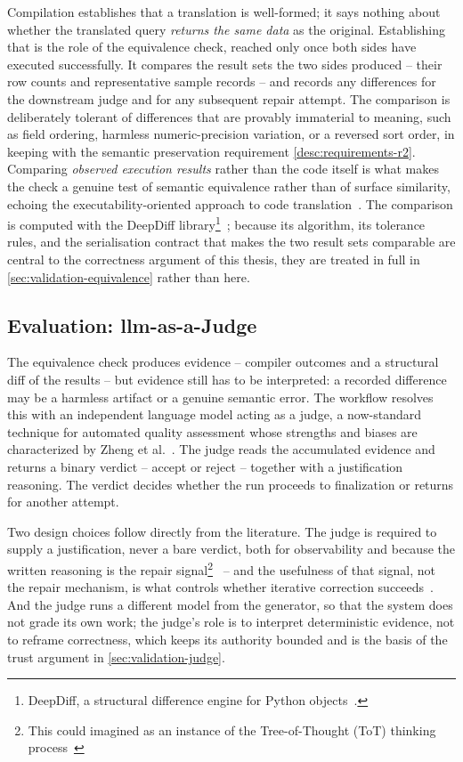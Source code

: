 Compilation establishes that a translation is well-formed; it says nothing about whether the translated query \emph{returns the same data} as the original. Establishing that is the role of the equivalence check, reached only once both sides have executed successfully. It compares the result sets the two sides produced -- their row counts and representative sample records -- and records any differences for the downstream judge and for any subsequent repair attempt. The comparison is deliberately tolerant of differences that are provably immaterial to meaning, such as field ordering, harmless numeric-precision variation, or a reversed sort order, in keeping with the semantic preservation requirement \ref{desc:requirements-r2}. Comparing \emph{observed execution results} rather than the code itself is what makes the check a genuine test of semantic equivalence rather than of surface similarity, echoing the executability-oriented approach to code translation~\cite{execoder2025}. The comparison is computed with the DeepDiff library\footnote{DeepDiff, a structural difference engine for Python objects~\cite{deepdiff}.}~\cite{deepdiff}; because its algorithm, its tolerance rules, and the serialisation contract that makes the two result sets comparable are central to the correctness argument of this thesis, they are treated in full in \cref{sec:validation-equivalence} rather than here.

\subsection{Evaluation: \Acrshort{llm}-as-a-Judge}
\label{sec:workflow-judge}

The equivalence check produces evidence -- compiler outcomes and a structural diff of the results -- but evidence still has to be interpreted: a recorded difference may be a harmless artifact or a genuine semantic error. The workflow resolves this with an independent language model acting as a judge, a now-standard technique for automated quality assessment whose strengths and biases are characterized by Zheng et al.~\cite{zhengJudgingLLMasaJudge2023}. The judge reads the accumulated evidence and returns a binary verdict -- accept or reject -- together with a justification reasoning. The verdict decides whether the run proceeds to finalization or returns for another attempt.

Two design choices follow directly from the literature. The judge is required to supply a justification, never a bare verdict, both for observability and because the written reasoning is the repair signal\footnote{This could imagined as an instance of the Tree-of-Thought (ToT) thinking process~\cite{yaoTreeThoughtsDeliberate2023}}~\cite{yaoTreeThoughtsDeliberate2023} -- and the usefulness of that signal, not the repair mechanism, is what controls whether iterative correction succeeds~\cite{olaussonSelfRepair2024}. And the judge runs a different model from the generator, so that the system does not grade its own work; the judge's role is to interpret deterministic evidence, not to reframe correctness, which keeps its authority bounded and is the basis of the trust argument in \cref{sec:validation-judge}.

